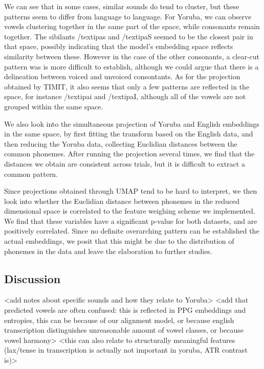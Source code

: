 \documentclass[11pt]{article}
\begin{document}
{We can see that in some cases, similar sounds do tend to cluster, but these patterns seem to differ from language to language. For Yoruba, we can observe vowels clustering together in the same part of the space, while consonants remain together. The sibilants /textipa{s} and /textipa{S} seemed to be the closest pair in that space, possibly indicating that the model's embedding space reflects similarity between these. However in the case of the other consonants, a clear-cut pattern was is more difficult to establish, although we could argue that there is a delineation between voiced and unvoiced consontants. As for the projection obtained by TIMIT, it also seems that only a few patterns are reflected in the space, for instance /textipa{i} and  /textipa{I}, although all of the vowels are not grouped within the same space.

We also look into the simultaneous projection of Yoruba and English embeddings in the same space, by first fitting the transform based on the English data, and then reducing the Yoruba data, collecting Euclidian distances between the common phonemes. After running the projection several times, we find that the distances we obtain are consistent across trials, but it is difficult to extract a common pattern.

Since projections obtained through UMAP tend to be hard to interpret, we then look into whether the Euclidian distance between phonemes in the reduced dimensional space is correlated to the feature weighing scheme we implemented. We find that these variables have a significant p-value for both datasets, and are positively correlated. Since no definite overarching pattern can be established the actual embeddings, we posit that this might be due to the distribution of phonemes in the data and leave the elaboration to further studies. 	

\subsection{Discussion}

<add notes about specific sounds and how they relate to Yoruba>
<add that predicted vowels are often confused: this is reflected in PPG embeddings and entropies, this can be because of our alignment model,
or because english transcription distinguishes unreasonable amount of vowel classes, or because vowel harmony>
<this can also relate to structurally meaningful features (lax/tense in transcription is actually not important in yoruba, ATR contrast is)>

}
\end{document}
